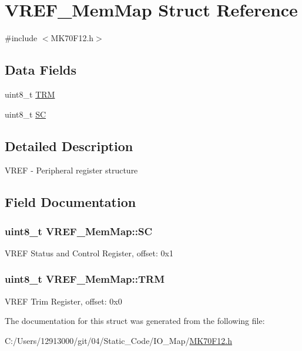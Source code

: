 \hypertarget{struct_v_r_e_f___mem_map}{}\section{V\+R\+E\+F\+\_\+\+Mem\+Map Struct Reference}
\label{struct_v_r_e_f___mem_map}


{\ttfamily \#include $<$M\+K70\+F12.\+h$>$}

\subsection*{Data Fields}
\begin{DoxyCompactItemize}
\item 
uint8\+\_\+t \hyperlink{struct_v_r_e_f___mem_map_a987ecd280eb0b25ff58841b304de2e1f}{T\+R\+M}
\item 
uint8\+\_\+t \hyperlink{struct_v_r_e_f___mem_map_a5d8e7e9026a69a14ff0d0b3caee5cf24}{S\+C}
\end{DoxyCompactItemize}


\subsection{Detailed Description}
V\+R\+E\+F -\/ Peripheral register structure 

\subsection{Field Documentation}
\hypertarget{struct_v_r_e_f___mem_map_a5d8e7e9026a69a14ff0d0b3caee5cf24}{}
\subsubsection[{S\+C}]{\setlength{\rightskip}{0pt plus 5cm}uint8\+\_\+t V\+R\+E\+F\+\_\+\+Mem\+Map\+::\+S\+C}\label{struct_v_r_e_f___mem_map_a5d8e7e9026a69a14ff0d0b3caee5cf24}
V\+R\+E\+F Status and Control Register, offset\+: 0x1 \hypertarget{struct_v_r_e_f___mem_map_a987ecd280eb0b25ff58841b304de2e1f}{}
\subsubsection[{T\+R\+M}]{\setlength{\rightskip}{0pt plus 5cm}uint8\+\_\+t V\+R\+E\+F\+\_\+\+Mem\+Map\+::\+T\+R\+M}\label{struct_v_r_e_f___mem_map_a987ecd280eb0b25ff58841b304de2e1f}
V\+R\+E\+F Trim Register, offset\+: 0x0 

The documentation for this struct was generated from the following file\+:\begin{DoxyCompactItemize}
\item 
C\+:/\+Users/12913000/git/04/\+Static\+\_\+\+Code/\+I\+O\+\_\+\+Map/\hyperlink{_m_k70_f12_8h}{M\+K70\+F12.\+h}\end{DoxyCompactItemize}
